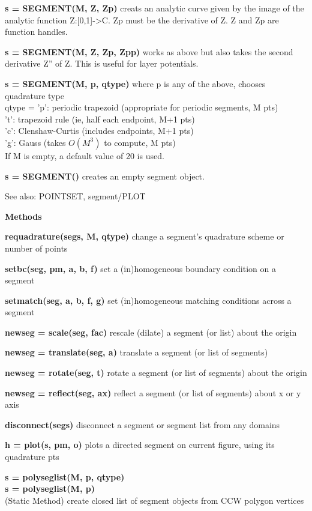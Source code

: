 \textbf{s = SEGMENT(M, {Z, Zp})} creats an analytic curve given by the image of 
the analytic function Z:[0,1]->C. Zp must be the derivative of Z. 
Z and Zp are function handles. 
  
\textbf{s = SEGMENT(M, {Z, Zp, Zpp})} works as above but also takes the second
derivative Z'' of Z. This is useful for layer potentials.
 
\textbf{s = SEGMENT(M, p, qtype)} where p is any of the above, chooses quadrature type\\
    qtype = 'p': periodic trapezoid (appropriate for periodic segments, M pts)\\
          't': trapezoid rule (ie, half each endpoint, M+1 pts)\\
           'c': Clenshaw-Curtis (includes endpoints, M+1 pts)\\
           'g': Gauss (takes $O(M^3)$ to compute, M pts)\\

If M is empty, a default value of 20 is used.

\textbf{s = SEGMENT()} creates an empty segment object.

See also: POINTSET, segment/PLOT

\textbf{Methods}

\textbf{requadrature(segs, M, qtype)} change a segment's quadrature
scheme or number of points

\textbf{setbc(seg, pm, a, b, f)} set a (in)homogeneous boundary
condition on a segment

\textbf{setmatch(seg, a, b, f, g)} set (in)homogeneous matching
conditions across a segment 

\textbf{newseg = scale(seg, fac)} rescale (dilate) a segment (or list)
about the origin

\textbf{newseg = translate(seg, a)} translate a segment (or list of segments)

\textbf{newseg = rotate(seg, t)} rotate a segment (or list of
segments) about the origin

\textbf{newseg = reflect(seg, ax)} reflect a segment (or list of
segments) about x or y axis

\textbf{disconnect(segs)} disconnect a segment or segment list from any domains

\textbf{h = plot(s, pm, o)} plots a directed segment on current
figure, using its quadrature pts


\textbf{s = polyseglist(M, p, qtype)}\\
\textbf{s = polyseglist(M, p)}\\
(Static Method) create closed list of segment objects from CCW polygon vertices

